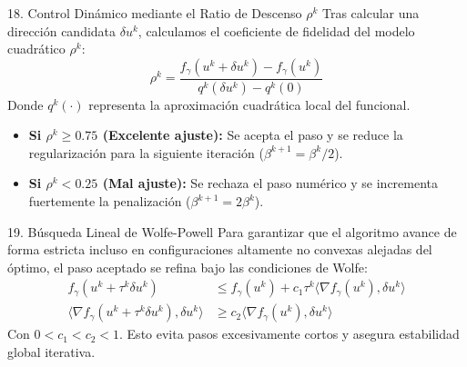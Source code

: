 \documentclass[aspectratio=169,11pt]{beamer}
\begin{document}
\begin{frame}{18. Control Dinámico mediante el Ratio de Descenso $\rho^k$}
    Tras calcular una dirección candidata $\delta u^k$, calculamos el coeficiente de fidelidad del modelo cuadrático $\rho^k$:
    \begin{equation}
        \rho^k = \frac{f_\gamma(u^k + \delta u^k) - f_\gamma(u^k)}{q^k(\delta u^k) - q^k(0)}
    \end{equation}
    Donde $q^k(\cdot)$ representa la aproximación cuadrática local del funcional.
    \begin{itemize}
        \item \textbf{Si $\rho^k \ge 0.75$ (Excelente ajuste):} Se acepta el paso y se reduce la regularización para la siguiente iteración ($\beta^{k+1} = \beta^k / 2$).
        \item \textbf{Si $\rho^k < 0.25$ (Mal ajuste):} Se rechaza el paso numérico y se incrementa fuertemente la penalización ($\beta^{k+1} = 2\beta^k$).
    \end{itemize}
\end{frame}

\begin{frame}{19. Búsqueda Lineal de Wolfe-Powell}
    Para garantizar que el algoritmo avance de forma estricta incluso en configuraciones altamente no convexas alejadas del óptimo, el paso aceptado se refina bajo las condiciones de Wolfe:
    \begin{align}
        f_\gamma(u^k + \tau^k \delta u^k) &\le f_\gamma(u^k) + c_1 \tau^k \langle \nabla f_\gamma(u^k), \delta u^k \rangle \\
        \langle \nabla f_\gamma(u^k + \tau^k \delta u^k), \delta u^k \rangle &\ge c_2 \langle \nabla f_\gamma(u^k), \delta u^k \rangle
    \end{align}
    Con $0 < c_1 < c_2 < 1$. Esto evita pasos excesivamente cortos y asegura estabilidad global iterativa.
\end{frame}
\end{document}
